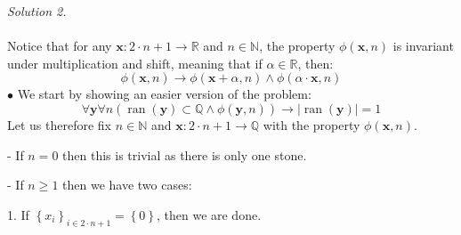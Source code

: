 \begin{solution}
    \textit{Solution 2.}
    \\\\
    Notice that for any \( \mathbf{x}: 2 \cdot n + 1 \to \mathbb{R} \) and \( n \in \mathbb{N} \), the property \( \phi\left(\mathbf{x}, n\right) \) is invariant under multiplication and shift, meaning that if \( \alpha \in \mathbb{R} \), then:
    \[
        \phi\left(\mathbf{x}, n\right) \rightarrow \phi\left(\mathbf{x} + \alpha, n\right) \wedge \phi\left(\alpha \cdot \mathbf{x}, n\right)
    \]
    \( \bullet \) We start by showing an easier version of the problem:
    \[
        \forall \mathbf{y} \forall n \left( \operatorname{ran}\left(\mathbf{y}\right) \subset \mathbb{Q} \wedge \phi\left(\mathbf{y}, n\right) \right) \rightarrow | \operatorname{ran}\left(\mathbf{y}\right) | = 1
    \]
    Let us therefore fix \( n \in \mathbb{N} \) and \( \mathbf{x}: 2 \cdot n + 1 \to \mathbb{Q} \) with the property \( \phi\left(\mathbf{x}, n\right) \).

    - If \( n = 0 \) then this is trivial as there is only one stone.

    - If \( n \geq 1 \) then we have two cases:

    1. If \( \left\{x_i\right\}_{i \in 2 \cdot n + 1} = \left\{0\right\} \), then we are done.


\end{solution}
